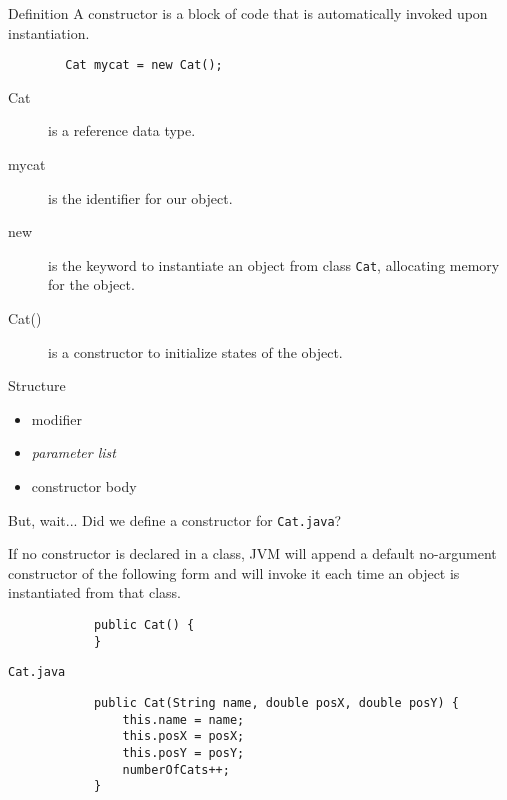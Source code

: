 \documentclass[10pt, compress]{beamer}
\begin{document}
\begin{slide}
	\begin{block}{Definition}
		A constructor is a block of code that is automatically invoked upon instantiation.
		\begin{verbatim}
		Cat mycat = new Cat();
		\end{verbatim}
		\begin{description}
			\item[Cat] is a reference data type.
			\item[mycat] is the identifier for our object.
			\item[new] is the keyword to instantiate an object from class \texttt{Cat}, allocating memory for the object.
			\item[Cat()] is a constructor to initialize states of the object.
		\end{description}
	\end{block}
\end{slide}

\begin{slide}
	\begin{block}{Structure}
		\begin{itemize}
			\item[] modifier
			\item[] \emph{parameter list}
			\item[] constructor body
		\end{itemize}
	\end{block}
	\begin{block}{But, wait...}
		Did we define a constructor for \texttt{Cat.java}?

		If no constructor is declared in a class, JVM will append a default no-argument constructor of the following form and will invoke it each time an object is instantiated from that class.
		\begin{verbatim}
			public Cat() {
			}
		\end{verbatim}
	\end{block}
\end{slide}

\begin{slide}
	\begin{block}{\texttt{Cat.java}}
		\begin{verbatim}
			public Cat(String name, double posX, double posY) {
			    this.name = name;
			    this.posX = posX;
			    this.posY = posY;
			    numberOfCats++;
			}
		\end{verbatim}
	\end{block}
\end{slide}
\end{document}
